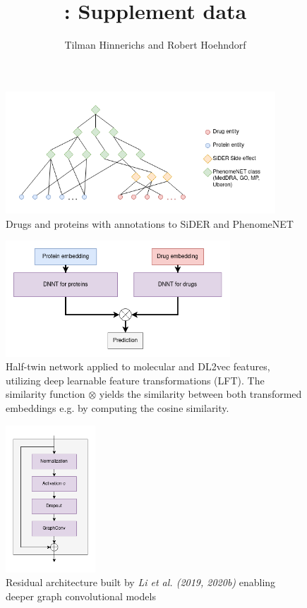 \documentclass[]{article}
\title{\name{}: Supplement data}
\author{Tilman Hinnerichs and Robert Hoehndorf}
\date{}
\begin{document}
\maketitle

\begin{figure}[ht]%
 	\centerline{\includegraphics[width=0.9\textwidth]{../figures/drug_protein_ontology_network.png}}
 	\caption{Drugs and proteins with annotations to SiDER and PhenomeNET}
 	\label{fig:Onto}
\end{figure}

\clearpage

\begin{figure}[ht]%
 	\centerline{\includegraphics[width=0.75\textwidth]{../figures/siamese_network.png}}
 	\caption{Half-twin network applied to molecular and DL2vec
        features, utilizing deep learnable feature transformations
        (LFT). The similarity function $\otimes$ yields the
        similarity between both transformed embeddings e.g. by
        computing the cosine similarity.}
 	\label{fig:HalfTwinNetwork}
\end{figure}

\clearpage
\begin{figure}[ht]%
 	\centerline{\includegraphics[width=0.3\textwidth]{../figures/ResGraphConvBlocks.png}}
 	\caption{Residual architecture built by \textit{Li et al. (2019, 2020b)} enabling deeper graph convolutional models}
 	\label{fig:ResGraphConvBlocks}
\end{figure}
\end{document}
